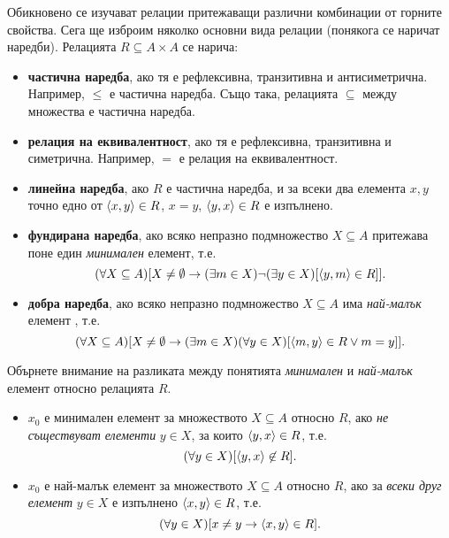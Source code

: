 Обикновено се изучават релации притежаващи различни комбинации от горните свойства. 
Сега ще изброим няколко основни вида релации (понякога се наричат наредби).
Релацията $R \subseteq A\times A$ се нарича:
\begin{itemize}
\item
  {\bf частична наредба}, ако тя е рефлексивна, транзитивна и антисиметрична.
  Например, $\leq$ е частична наредба.
  Също така, релацията $\subseteq$ между множества е частична наредба.
\item 
  {\bf релация на еквивалентност}, ако тя е рефлексивна, транзитивна и симетрична.
  Например, $=$ е релация на еквивалентност.
\item
  {\bf линейна наредба}, ако $R$ е частична наредба, 
  и за всеки два елемента $x,y$ точно едно от $\langle{x,y}\rangle \in R$, $x = y$, $\langle{y,x}\rangle\in R$ е изпълнено.
\item
  {\bf фундирана наредба}, 
  ако всяко непразно подмножество $X\subseteq A$ притежава поне един {\em минимален} елемент, т.е.
  \[(\forall X\subseteq A)[X\neq\emptyset \rightarrow (\exists m\in X)\neg(\exists y\in X)[\langle{y,m}\rangle \in R]].\]
\item
  {\bf добра наредба}, ако всяко непразно подмножество $X\subseteq A$ има {\em най-малък} елемент , т.е.
  \[(\forall X\subseteq A)[X\neq\emptyset \rightarrow (\exists m\in X)(\forall y\in X)[\langle{m,y}\rangle\in R \vee m = y]].\]
\end{itemize}

\begin{remark}
  Обърнете внимание на разликата между понятията {\em минимален} и {\em най-малък} елемент относно релацията $R$.
  \begin{itemize}
  \item $x_0$ е минимален елемент за множеството $X \subseteq A$ относно $R$,
    ако {\em не съществуват елементи} $y \in X$, за които $\langle{y,x}\rangle\in R$, т.е.
    \[(\forall y \in X)[\langle{y,x}\rangle \not\in R].\]
  \item $x_0$ е най-малък елемент за множеството $X \subseteq A$ относно $R$,
    ако за {\em всеки друг елемент} $y \in X$ е изпълнено $\langle{x,y}\rangle\in R$, т.е.
    \[(\forall y \in X)[x\neq y \rightarrow \langle{x,y}\rangle \in R].\]
  \end{itemize}
\end{remark}

